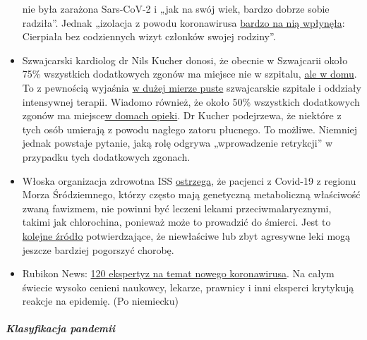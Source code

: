 \begin{itemize}
  nie była zarażona Sars-CoV-2 i „jak na swój wiek, bardzo dobrze sobie
  radziła''. Jednak „izolacja z powodu koronawirusa
  \href{https://swprs.files.wordpress.com/2020/04/tagblatt-109.jpg}{bardzo
  na nią wpłynęła}: Cierpiała bez codziennych wizyt członków swojej
  rodziny''.
\item
  Szwajcarski kardiolog dr Nils Kucher donosi, że obecnie w Szwajcarii
  około 75\% wszystkich dodatkowych zgonów ma miejsce nie w szpitalu,
  \href{https://www.tagesspiegel.de/wissen/woran-sterben-corona-patienten-wirklich-ein-schweizer-forscher-macht-hoffnung-im-kampf-gegen-covid-19/25750666.html}{ale
  w domu}. To z pewnością wyjaśnia
  \href{https://swprs.files.wordpress.com/2020/04/intensivbettenbelegung-schweiz-2020-04-14.png}{w
  dużej mierze puste} szwajcarskie szpitale i oddziały intensywnej
  terapii. Wiadomo również, że około 50\% wszystkich dodatkowych zgonów
  ma
  miejsce\href{https://www.nzz.ch/zuerich/coronavirus-zuerich-aendert-nun-das-testregime-in-heimenauch-viele-aeltere-covid-19-infizierte-entwickeln-keine-symptome-zuerich-aendert-nun-das-testregime-in-heimen-ld.1552089}{w
  domach opieki}. Dr Kucher podejrzewa, że niektóre z tych osób umierają
  z powodu nagłego zatoru płucnego. To możliwe. Niemniej jednak powstaje
  pytanie, jaką rolę odgrywa „wprowadzenie retrykcji'' w przypadku tych
  dodatkowych zgonach.
\item
  Włoska organizacja zdrowotna ISS
  \href{https://www.iss.it/en/rapporti-covid-19/-/asset_publisher/btw1J82wtYzH/content/id/5334891}{ostrzega},
  że pacjenci z Covid-19 z regionu Morza Śródziemnego, którzy często
  mają genetyczną metaboliczną właściwość zwaną fawizmem, nie powinni
  być leczeni lekami przeciwmalarycznymi, takimi jak chlorochina,
  ponieważ może to prowadzić do śmierci. Jest to
  \href{https://www.sciencedaily.com/releases/2020/02/200206110703.htm}{kolejne
  źródło} potwierdzające, że niewłaściwe lub zbyt agresywne leki mogą
  jeszcze bardziej pogorszyć chorobę.
\item
  Rubikon News:
  \href{https://www.rubikon.news/artikel/120-expertenstimmen-zu-corona}{120
  ekspertyz na temat nowego koronawirusa}. Na całym świecie wysoko
  cenieni naukowcy, lekarze, prawnicy i inni eksperci krytykują reakcje
  na epidemię. (Po niemiecku)
\end{itemize}

\hypertarget{klasyfikacja-pandemii}{%
\subparagraph{\texorpdfstring{\textbf{Klasyfikacja
pandemii}}{Klasyfikacja pandemii}}\label{klasyfikacja-pandemii}}

